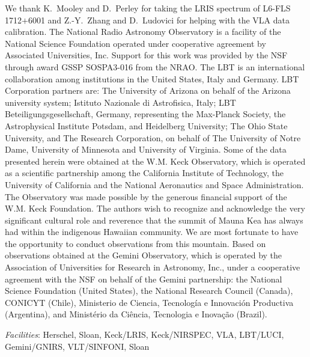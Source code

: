 \documentclass[iop,revtex4,twocolumn,apj,numberedappendix,appendixfloats]{emulateapj}
\begin{document}
We thank K.~Mooley and D.~Perley for taking the LRIS spectrum of L6-FLS\,1712$+$6001 and Z.-Y.~Zhang and D.~Ludovici for helping with the VLA data calibration. 
The National Radio Astronomy Observatory is a facility of the National Science Foundation operated under cooperative agreement by Associated Universities, Inc. Support for this work was provided by the NSF through award GSSP SOSPA3-016 from the NRAO.
The LBT is an international collaboration among institutions in the United States, Italy and Germany. LBT Corporation partners are: The University of Arizona on behalf of the Arizona university system; Istituto Nazionale di Astrofisica, Italy; LBT Beteiligungsgesellschaft, Germany, representing the Max-Planck Society, the Astrophysical Institute Potsdam, and Heidelberg University; The Ohio State University, and The Research Corporation, on behalf of The University of Notre Dame, University of Minnesota and University of Virginia.
Some of the data presented herein were obtained at the W.M. Keck Observatory, which is operated as a scientific partnership among the California Institute of Technology, the University of California and the National Aeronautics and Space Administration. The Observatory was made possible by the generous financial support of the W.M. Keck Foundation.
The authors wish to recognize and acknowledge the very significant cultural role and reverence that the summit of Mauna Kea has always had within the indigenous Hawaiian community.  We are most fortunate to have the opportunity to conduct observations from this mountain.
Based on observations obtained at the Gemini Observatory, which is operated by the Association of Universities for Research in Astronomy, Inc., under a cooperative agreement with the NSF on behalf of the Gemini partnership: the National Science Foundation (United States), the National Research Council (Canada), CONICYT (Chile), Ministerio de Ciencia, Tecnolog\'{i}a e Innovaci\'{o}n Productiva (Argentina), and Minist\'{e}rio da Ci\^{e}ncia, Tecnologia e Inova\c{c}\~{a}o (Brazil).
 
{\it Facilities}: Herschel, Sloan, Keck/LRIS, Keck/NIRSPEC, VLA, LBT/LUCI, Gemini/GNIRS, VLT/SINFONI, Sloan





\clearpage
\end{document}
